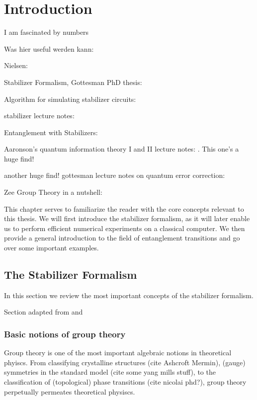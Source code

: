 \chapter{Introduction}
\label{ch:basics}
\epigraph{I am fascinated by numbers}{
\citeauthor{baron-cohenAutismSpectrumQuotientAQ2001}}

Was hier useful werden kann:

Nielsen: \cite{nielsenQuantumComputationQuantum2010}

Stabilizer Formalism, Gottesman PhD thesis: \cite{gottesmanStabilizerCodesQuantum1997}

Algorithm for simulating stabilizer circuits:
\cite{aaronsonImprovedSimulationStabilizer2004}

stabilizer lecture notes: \cite{arabLectureNotesQuantum2024}

Entanglement with Stabilizers: \cite{fattalEntanglementStabilizerFormalism2004}

Aaronson's quantum information theory I and II lecture notes:
\cite{aaronsonIntroductionQuantumInformation,aaronsonIntroductionQuantumInformationa}.
This one's a huge find!

another huge find! gottesman lecture notes on quantum error correction:
\cite{gottesmanSurvivingQuantumComputer2024}

Zee Group Theory in a nutshell: \cite{zeeGroupTheoryNutshell2016}

This chapter serves to familiarize the reader with the core concepts relevant
to this thesis. We will first introduce the stabilizer formalism, as it will
later enable us to perform efficient numerical experiments on a classical
computer. We then provide a general introduction to the field of entanglement
transitions and go over some important examples. 
\section{The Stabilizer Formalism}\label{sec:stab-basics}
In this section we review the most important concepts of the stabilizer
formalism. 

Section adapted from \cite{nielsenQuantumComputationQuantum2010} and
\cite{gottesmanStabilizerCodesQuantum1997}
\subsection{Basic notions of group theory}
Group theory is one of the most important algebraic notions in theoretical
phyiscs. From classifying crystalline structures (cite Ashcroft Mermin),
(gauge) symmetries in the standard model (cite some yang mills stuff), to the
classification of (topological) phase transitions (cite nicolai phd?), group
theory perpetually permeates theoretical physiscs.

